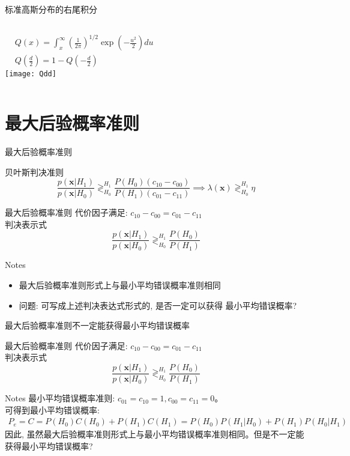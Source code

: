 \begin{frame}[shrink]{标准高斯分布的右尾积分}
\begin{columns}
	\begin{align*}
	&Q(x)=\int_{x}^{\infty}\left(\frac{1}{2\pi}\right)^{1/2}\exp\left(-\frac{u^2}{2}\right)du\\
	&Q\left(\frac{d}{2}\right) = 1-Q\left(-\frac{d}{2}\right)
	\end{align*}
	\centering
	\texttt{[image: Qdd]}
\end{columns}
\end{frame}

\section{最大后验概率准则}

\begin{frame}[shrink]{最大后验概率准则}
\begin{block}{贝叶斯判决准则}
	\[ \frac{p(\bm{x}|H_1)}{p(\bm{x}|H_0)}\mathop{\gtrless}_{H_0}^{H_1}\frac{P(H_0)(c_{10}-c_{00})}{P(H_1)(c_{01}-c_{11})} \implies \lambda(\bm{x})\mathop{\gtrless}_{H_0}^{H_1}\eta \]
\end{block}
\begin{block}{最大后验概率准则}
	代价因子满足: $c_{10}-c_{00}=c_{01}-c_{11}$\\
	判决表示式
	\[ \frac{p(\bm{x}|H_1)}{p(\bm{x}|H_0)}\mathop{\gtrless}_{H_0}^{H_1}\frac{P(H_0)}{P(H_1)} \]
\end{block}
\begin{block}{Notes}
	\small
	\begin{itemize}
		\item 最大后验概率准则形式上与最小平均错误概率准则相同
		\item 问题: 可写成上述判决表达式形式的, 是否一定可以获得
		最小平均错误概率?
	\end{itemize}
\end{block}
\end{frame}

\begin{frame}[shrink]{最大后验概率准则不一定能获得最小平均错误概率}
\begin{block}{最大后验概率准则}
	代价因子满足: $c_{10}-c_{00}=c_{01}-c_{11}$\\
	判决表示式
	\[ \frac{p(\bm{x}|H_1)}{p(\bm{x}|H_0)}\mathop{\gtrless}_{H_0}^{H_1}\frac{P(H_0)}{P(H_1)} \]
\end{block}
\begin{block}{Notes}
	最小平均错误概率准则: $c_{01}=c_{10}=1, c_{00}=c_{11}=0$。\\ 
	可得到最小平均错误概率:
	\begin{align*}
	P_e=C=P(H_0)C(H_0)+P(H_1)C(H_1)=P(H_0)P(H_1|H_0)+P(H_1)P(H_0|H_1)
	\end{align*}
	因此, 虽然最大后验概率准则形式上与最小平均错误概率准则相同。但是不一定能获得最小平均错误概率?
\end{block}
\end{frame}

